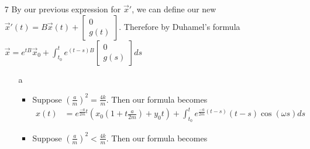 \documentclass[12pt, letterpaper]{article}
\begin{document}
\begin{enumerate}
\begin{enumerate}
\begin{itemize}
		\end{itemize}
	\end{enumerate}
	\item[7] By our previous expression for $\Vec{x}'$, we can define our new $\Vec{x}'(t) = B \Vec{x} (t) + \begin{bmatrix}0 \\ g(t) \end{bmatrix}$. 
		Therefore by Duhamel's formula $\Vec{x} = e^{tB}\Vec{x}_0 + \int_{t_0}^t e^{(t-s)B} \begin{bmatrix}0 \\ g(s) \end{bmatrix}ds$	
	\begin{enumerate}
		\item[a] 
		\begin{itemize}
			\item Suppose $(\frac{a}{m})^2 = \frac{4k}{m}$.  Then our formula becomes 
			\begin{align*}
				 x(t) &= e^{\frac{-a}{2m}t} (x_0(1 + t\frac{a}{2m}) + y_0 t) + \int_{t_0}^t  e^{\frac{-a}{2m}(t-s)}(t-s)\cos(\omega s) ds 
			\end{align*}			  
			\item Suppose $(\frac{a}{m})^2 < \frac{4k}{m}$.  Then our formula becomes 
			$$
							
			$$
		\end{itemize}
	\end{enumerate}
\end{enumerate}
\end{document}

